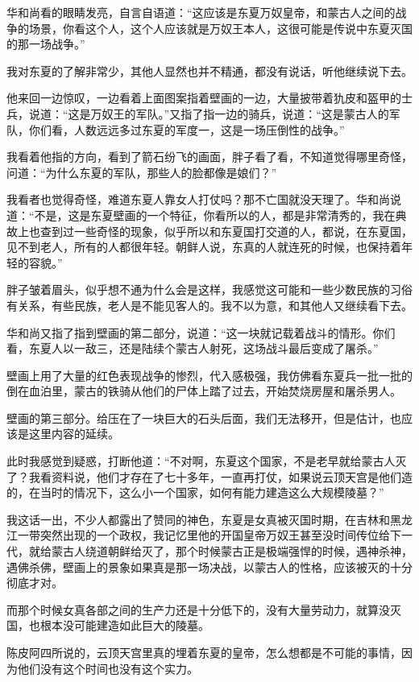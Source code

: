 华和尚看的眼睛发亮，自言自语道：“这应该是东夏万奴皇帝，和蒙古人之间的战争的场景，你看这个人，这个人应该就是万奴王本人，这很可能是传说中东夏灭国的那一场战争。”

我对东夏的了解非常少，其他人显然也并不精通，都没有说话，听他继续说下去。

他来回一边惊叹，一边看着上面图案指着壁画的一边，大量披带着犰皮和盔甲的士兵，说道：“这是万奴王的军队。”又指了指一边的骑兵，说道：“这是蒙古人的军队，你们看，人数远远多过东夏的军度一，这是一场压倒性的战争。”

我看着他指的方向，看到了箭石纷飞的画面，胖子看了看，不知道觉得哪里奇怪，问道：“为什么东夏的军队，那些人的脸都像是娘们？”

我看者也觉得奇怪，难道东夏人靠女人打仗吗？那不亡国就没天理了。华和尚说道：“不是，这是东夏壁画的一个特征，你看所以的人，都是非常清秀的，我在典故上也查到过一些奇怪的现象，似乎所以和东夏国打交道的人，都说，在东夏国，见不到老人，所有的人都很年轻。朝鲜人说，东真的人就连死的时候，也保持着年轻的容貌。”

胖子皱着眉头，似乎想不通为什么会是这样，我感觉这可能和一些少数民族的习俗有关系，有些民族，老人是不能见客人的。我不以为意，和其他人又继续看下去。

华和尚又指了指到壁画的第二部分，说道：“这一块就记载着战斗的情形。你们看，东夏人以一敌三，还是陆续个蒙古人射死，这场战斗最后变成了屠杀。”

壁画上用了大量的红色表现战争的惨烈，代入感极强，我仿佛看东夏兵一批一批的倒在血泊里，蒙古的铁骑从他们的尸体上踏了过去，开始焚烧房屋和屠杀男人。

壁画的第三部分。给压在了一块巨大的石头后面，我们无法移开，但是估计，也应该是这里内容的延续。

此时我感觉到疑惑，打断他道：“不对啊，东夏这个国家，不是老早就给蒙古人灭了？我看资料说，他们才存在了七十多年，一直再打仗，如果说云顶天宫是他们造的，在当时的情况下，这么小一个国家，如何有能力建造这么大规模陵墓？”

我这话一出，不少人都露出了赞同的神色，东夏是女真被灭国时期，在吉林和黑龙江一带突然出现的一个政权，我记忆里他的开国皇帝万奴王甚至没时间传位给下一代，就给蒙古人绕道朝鲜给灭了，那个时候蒙古正是极端强悍的时候，遇神杀神，遇佛杀佛，壁画上的景象如果真是那一场决战，以蒙古人的性格，应该被灭的十分彻底才对。

而那个时候女真各部之间的生产力还是十分低下的，没有大量劳动力，就算没灭国，也根本没可能建造如此巨大的陵墓。

陈皮阿四所说的，云顶天宫里真的埋着东夏的皇帝，怎么想都是不可能的事情，因为他们没有这个时间也没有这个实力。

